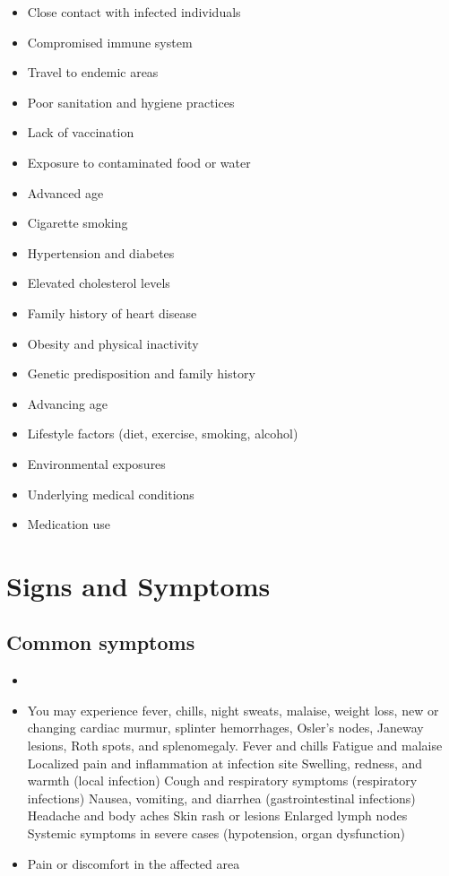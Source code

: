 \begin{itemize}[noitemsep]
  \item Close contact with infected individuals
  \item Compromised immune system
  \item Travel to endemic areas
  \item Poor sanitation and hygiene practices
  \item Lack of vaccination
  \item Exposure to contaminated food or water
  \item Advanced age
  \item Cigarette smoking
  \item Hypertension and diabetes
  \item Elevated cholesterol levels
  \item Family history of heart disease
  \item Obesity and physical inactivity
  \item Genetic predisposition and family history
  \item Advancing age
  \item Lifestyle factors (diet, exercise, smoking, alcohol)
  \item Environmental exposures
  \item Underlying medical conditions
  \item Medication use
\end{itemize}
\section{Signs and Symptoms}

\subsection{Common symptoms}
\begin{itemize}[noitemsep]
  \item \item You may experience fever, chills, night sweats, malaise, weight loss, new or changing cardiac murmur, splinter hemorrhages, Osler's nodes, Janeway lesions, Roth spots, and splenomegaly. Fever and chills Fatigue and malaise Localized pain and inflammation at infection site Swelling, redness, and warmth (local infection) Cough and respiratory symptoms (respiratory infections) Nausea, vomiting, and diarrhea (gastrointestinal infections) Headache and body aches Skin rash or lesions Enlarged lymph nodes Systemic symptoms in severe cases (hypotension, organ dysfunction)

  \item Pain or discomfort in the affected area
  \end{itemize}

